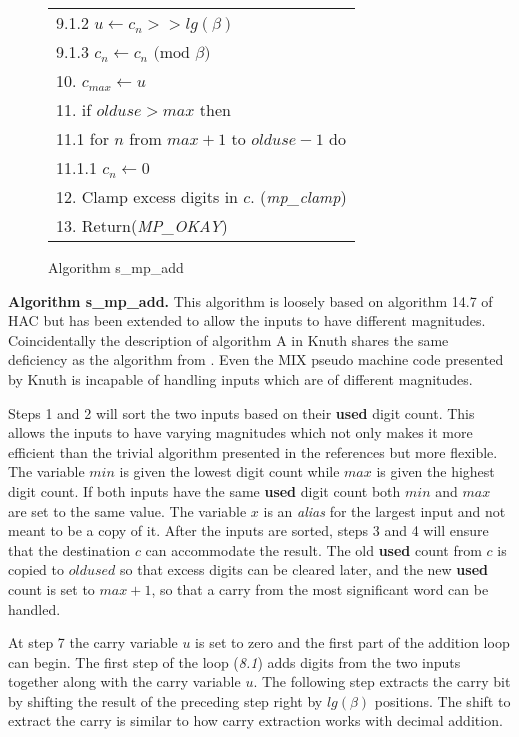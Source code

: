 \documentclass[b5paper]{book}
\begin{document}
\begin{figure}[!here]
\begin{center}
\begin{small}
\begin{tabular}{l}
\hspace{+6mm}9.1.2  $u \leftarrow c_n >> lg(\beta)$ \\
\hspace{+6mm}9.1.3  $c_n \leftarrow c_n \mbox{ (mod }\beta\mbox{)}$ \\
10.  $c_{max} \leftarrow u$ \\
11.  if $olduse > max$ then \\
\hspace{+3mm}11.1  for $n$ from $max + 1$ to $olduse - 1$ do \\
\hspace{+6mm}11.1.1  $c_n \leftarrow 0$ \\
12.  Clamp excess digits in $c$.  (\textit{mp\_clamp}) \\
13.  Return(\textit{MP\_OKAY}) \\
\hline
\end{tabular}
\end{small}
\end{center}
\caption{Algorithm s\_mp\_add}
\end{figure}

\textbf{Algorithm s\_mp\_add.}
This algorithm is loosely based on algorithm 14.7 of HAC \cite[pp. 594]{HAC} but has been extended to allow the inputs to have different magnitudes.  
Coincidentally the description of algorithm A in Knuth \cite[pp. 266]{TAOCPV2} shares the same deficiency as the algorithm from \cite{HAC}.  Even the 
MIX pseudo  machine code presented by Knuth \cite[pp. 266-267]{TAOCPV2} is incapable of handling inputs which are of different magnitudes.

Steps 1 and 2 will sort the two inputs based on their \textbf{used} digit count.  This allows the inputs to have varying magnitudes which not 
only makes it more efficient than the trivial algorithm presented in the references but more flexible.  The variable $min$ is given the lowest 
digit count while $max$ is given the highest digit count.  If both inputs have the same \textbf{used} digit count both $min$ and $max$ are 
set to the same value.  The variable $x$ is an \textit{alias} for the largest input and not meant to be a copy of it.  After the inputs are sorted, 
steps 3 and 4 will ensure that the destination $c$ can accommodate the result.  The old \textbf{used} count from $c$ is copied to 
$oldused$ so that excess digits can be cleared later, and the new \textbf{used} count is set to $max+1$, so that a carry from the most significant 
word can be handled.

At step 7 the carry variable $u$ is set to zero and the first part of the addition loop can begin.  The first step of the loop (\textit{8.1}) adds
digits from the two inputs together along with the carry variable $u$.  The following step extracts the carry bit by shifting the result of the
preceding step right by $lg(\beta)$ positions.  The shift to extract the carry is similar to how carry extraction works with decimal addition.
\end{document}
